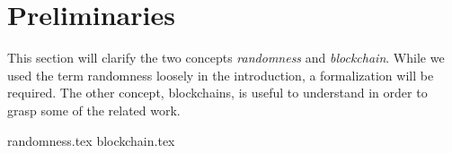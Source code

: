 \section{Preliminaries}\label{sec:preliminaries}
This section will clarify the two concepts \emph{randomness} and \emph{blockchain}. While we used the term randomness loosely in the introduction, a formalization will be required. The other concept, blockchains, is useful to understand in order to grasp some of the related work.

{randomness.tex}
{blockchain.tex}
